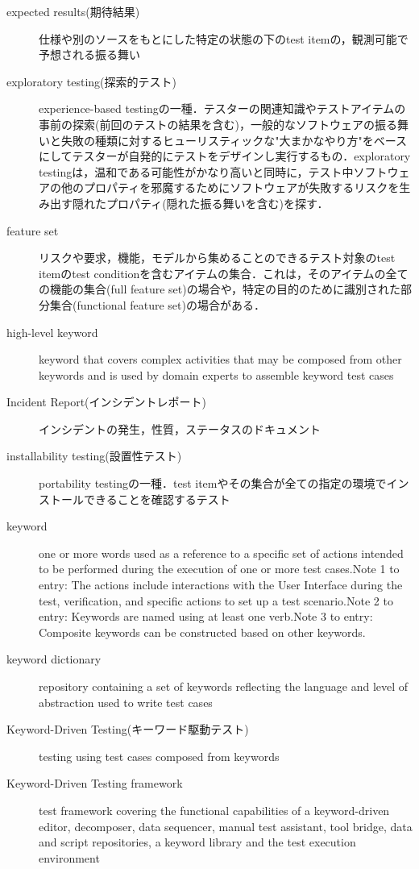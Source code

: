 \begin{description}
    \item[expected results(期待結果)]仕様や別のソースをもとにした特定の状態の下のtest itemの，観測可能で予想される振る舞い
    \item[exploratory testing(探索的テスト)]experience-based testingの一種．テスターの関連知識やテストアイテムの事前の探索(前回のテストの結果を含む)，一般的なソフトウェアの振る舞いと失敗の種類に対するヒューリスティックな"大まかなやり方"をベースにしてテスターが自発的にテストをデザインし実行するもの．exploratory testingは，温和である可能性がかなり高いと同時に，テスト中ソフトウェアの他のプロパティを邪魔するためにソフトウェアが失敗するリスクを生み出す隠れたプロパティ(隠れた振る舞いを含む)を探す．
    \item[feature set]リスクや要求，機能，モデルから集めることのできるテスト対象のtest itemのtest conditionを含むアイテムの集合．これは，そのアイテムの全ての機能の集合(full feature set)の場合や，特定の目的のために識別された部分集合(functional feature set)の場合がある．
    \item[high-level keyword]keyword that covers complex activities that may be composed from other keywords and is used by domain experts to assemble keyword test cases
    \item[Incident Report(インシデントレポート)]インシデントの発生，性質，ステータスのドキュメント
    \item[installability testing(設置性テスト)]portability testingの一種．test itemやその集合が全ての指定の環境でインストールできることを確認するテスト
    \item[keyword]one or more words used as a reference to a specific set of actions intended to be performed during the execution of one or more test cases.Note 1 to entry: The actions include interactions with the User Interface during the test, verification, and specific actions to set up a test scenario.Note 2 to entry: Keywords are named using at least one verb.Note 3 to entry: Composite keywords can be constructed based on other keywords.
    \item[keyword dictionary]repository containing a set of keywords reflecting the language and level of abstraction used to write test cases
    \item[Keyword-Driven Testing(キーワード駆動テスト)]testing using test cases composed from keywords
    \item[Keyword-Driven Testing framework]test framework covering the functional capabilities of a keyword-driven editor, decomposer, data sequencer, manual test assistant, tool bridge, data and script repositories, a keyword library and the test execution environment

\end{description}
